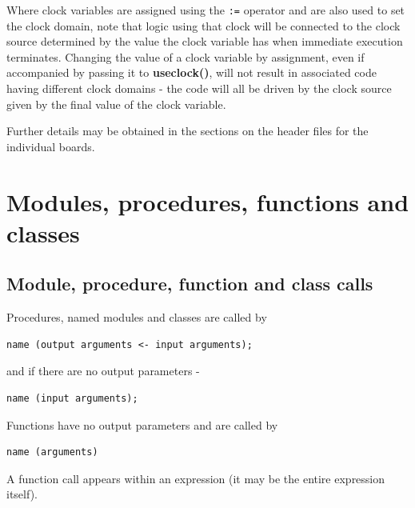             Where clock variables are assigned using the \verb':=' operator
            and are also used to set the clock domain, note that logic
            using that clock will be connected to the clock source determined
            by the value the clock variable has when immediate execution
            terminates. Changing the value of a clock variable by assignment,
            even if accompanied by passing it to {\bf useclock()}, will not
            result in associated code having different clock domains - the code
            will all be driven by the clock source given by the final value of
            the clock variable.

            Further details may be obtained in the sections on the header files
            for the individual boards.
















    \section{Modules, procedures, functions and classes}
        

        \subsection{Module, procedure, function and class calls}\label{sec:mpfccall}
        
            Procedures, named modules and classes are called by
            \begin{lstlisting}[gobble=12, language=threepl]
               name (output arguments <- input arguments);
            \end{lstlisting}
            and if there are no output parameters -
            \begin{lstlisting}[gobble=12, language=threepl]
               name (input arguments);
            \end{lstlisting}
            
            Functions have no output parameters and are called by
            \begin{lstlisting}[gobble=12, language=threepl]
               name (arguments)
            \end{lstlisting}
            A function call appears within an expression (it may be the entire
            expression itself).
            
